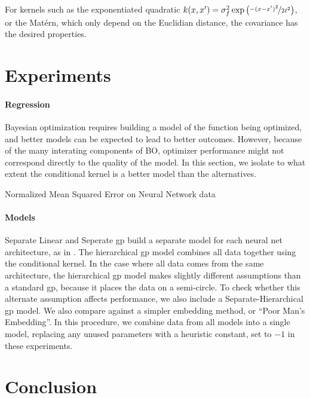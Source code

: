\documentclass{article}
\begin{document}
For kernels such as the exponentiated quadratic $k(x, x') = \sigma^2_f \exp \left( \nicefrac{-(x - x')^2}{2\ell^2} \right)$, or the Mat\'{e}rn, which only depend on the Euclidian distance, the covariance has the desired properties.






\section{Experiments}

\paragraph{Regression}   Bayesian optimization requires building a model of the function being optimized, and better models can be expected to lead to better outcomes.  However, because of the many interating components of BO, optimizer performance might not correspond directly to the quality of the model.  In this section, we isolate to what extent the conditional kernel is a better model than the alternatives.

\begin{table}[h!]
\caption{{\small
Normalized Mean Squared Error on Neural Network data
}}
\label{tbl:nn_nmse}

\end{table}

\paragraph{Models}
Separate Linear and Seperate {\sc gp} build a separate model for each neural net architecture, as in \cite{bergstra2011algorithms}.  The hierarchical {\sc gp} model combines all data together using the conditional kernel.
%
In the case where all data comes from the same architecture, the hierarchical {\sc gp} model makes slightly different assumptions than a standard {\sc gp}, because it places the data on a semi-circle.  To check whether this alternate assumption affects performance, we also include a Separate-Hierarchical {\sc gp} model.
%
We also compare against a simpler embedding method, or ``Poor Man's Embedding''.  In this procedure, we combine data from all models into a single model, replacing any unused parameters with a heuristic constant, set to $-1$ in these experiments.


\section{Conclusion}





\end{document}
